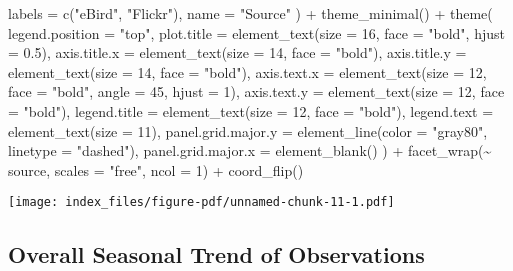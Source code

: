 \documentclass[
  letterpaper,
  DIV=11,
  numbers=noendperiod]{scrartcl}
\newenvironment{Shaded}{\begin{snugshade}}{\end{snugshade}}
\newcommand{\AttributeTok}[1]{\textcolor[rgb]{0.40,0.45,0.13}{#1}}
\newcommand{\DecValTok}[1]{\textcolor[rgb]{0.68,0.00,0.00}{#1}}
\newcommand{\FloatTok}[1]{\textcolor[rgb]{0.68,0.00,0.00}{#1}}
\newcommand{\FunctionTok}[1]{\textcolor[rgb]{0.28,0.35,0.67}{#1}}
\newcommand{\NormalTok}[1]{\textcolor[rgb]{0.00,0.23,0.31}{#1}}
\newcommand{\SpecialCharTok}[1]{\textcolor[rgb]{0.37,0.37,0.37}{#1}}
\newcommand{\StringTok}[1]{\textcolor[rgb]{0.13,0.47,0.30}{#1}}
\begin{document}
\begin{Shaded}
\begin{Highlighting}[]
    \AttributeTok{labels =} \FunctionTok{c}\NormalTok{(}\StringTok{"eBird"}\NormalTok{, }\StringTok{"Flickr"}\NormalTok{), }
    \AttributeTok{name =} \StringTok{"Source"}
\NormalTok{  ) }\SpecialCharTok{+}
  \FunctionTok{theme\_minimal}\NormalTok{() }\SpecialCharTok{+}
  \FunctionTok{theme}\NormalTok{(}
    \AttributeTok{legend.position =} \StringTok{"top"}\NormalTok{,}
    \AttributeTok{plot.title =} \FunctionTok{element\_text}\NormalTok{(}\AttributeTok{size =} \DecValTok{16}\NormalTok{, }\AttributeTok{face =} \StringTok{"bold"}\NormalTok{, }\AttributeTok{hjust =} \FloatTok{0.5}\NormalTok{), }
    \AttributeTok{axis.title.x =} \FunctionTok{element\_text}\NormalTok{(}\AttributeTok{size =} \DecValTok{14}\NormalTok{, }\AttributeTok{face =} \StringTok{"bold"}\NormalTok{),}
    \AttributeTok{axis.title.y =} \FunctionTok{element\_text}\NormalTok{(}\AttributeTok{size =} \DecValTok{14}\NormalTok{, }\AttributeTok{face =} \StringTok{"bold"}\NormalTok{),}
    \AttributeTok{axis.text.x =} \FunctionTok{element\_text}\NormalTok{(}\AttributeTok{size =} \DecValTok{12}\NormalTok{, }\AttributeTok{face =} \StringTok{"bold"}\NormalTok{, }\AttributeTok{angle =} \DecValTok{45}\NormalTok{, }\AttributeTok{hjust =} \DecValTok{1}\NormalTok{), }
    \AttributeTok{axis.text.y =} \FunctionTok{element\_text}\NormalTok{(}\AttributeTok{size =} \DecValTok{12}\NormalTok{, }\AttributeTok{face =} \StringTok{"bold"}\NormalTok{),}
    \AttributeTok{legend.title =} \FunctionTok{element\_text}\NormalTok{(}\AttributeTok{size =} \DecValTok{12}\NormalTok{, }\AttributeTok{face =} \StringTok{"bold"}\NormalTok{),}
    \AttributeTok{legend.text =} \FunctionTok{element\_text}\NormalTok{(}\AttributeTok{size =} \DecValTok{11}\NormalTok{),}
    \AttributeTok{panel.grid.major.y =} \FunctionTok{element\_line}\NormalTok{(}\AttributeTok{color =} \StringTok{"gray80"}\NormalTok{, }\AttributeTok{linetype =} \StringTok{"dashed"}\NormalTok{), }
    \AttributeTok{panel.grid.major.x =} \FunctionTok{element\_blank}\NormalTok{() }
\NormalTok{  ) }\SpecialCharTok{+}
  \FunctionTok{facet\_wrap}\NormalTok{(}\SpecialCharTok{\textasciitilde{}}\NormalTok{ source, }\AttributeTok{scales =} \StringTok{"free"}\NormalTok{, }\AttributeTok{ncol =} \DecValTok{1}\NormalTok{) }\SpecialCharTok{+}
  \FunctionTok{coord\_flip}\NormalTok{() }
\end{Highlighting}
\end{Shaded}

\texttt{[image: index\_files/figure-pdf/unnamed-chunk-11-1.pdf]}

\subsection{Overall Seasonal Trend of
Observations}\label{overall-seasonal-trend-of-observations}
\end{document}
